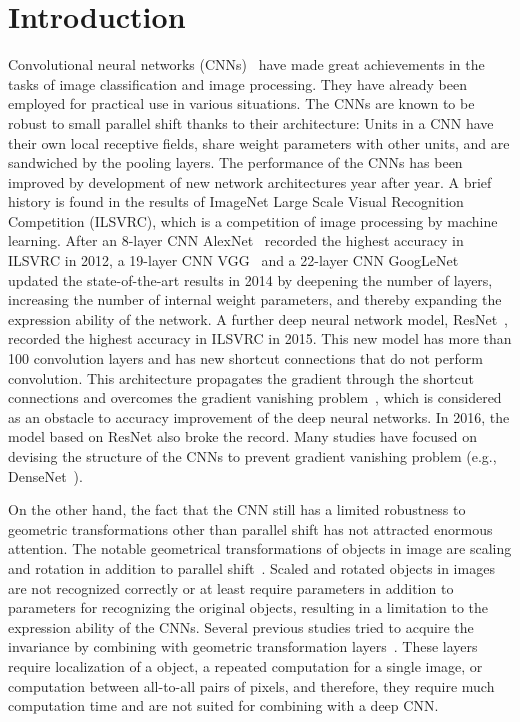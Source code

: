 \documentclass[journal]{IEEEtran}
\begin{document}
\section{Introduction}
Convolutional neural networks (CNNs)~\cite{LeCun1989} have made great achievements in the tasks of image classification and image processing.
They have already been employed for practical use in various situations.
The CNNs are known to be robust to small parallel shift thanks to their architecture: Units in a CNN have their own local receptive fields, share weight parameters with other units, and are sandwiched by the pooling layers.
The performance of the CNNs has been improved by development of new network architectures year after year.
A brief history is found in the results of ImageNet Large Scale Visual Recognition Competition (ILSVRC), which is a competition of image processing by machine learning.
After an 8-layer CNN AlexNet~\cite{Krizhevsky2012} recorded the highest accuracy in ILSVRC in 2012, a 19-layer CNN VGG~\cite{Simonyan2015a} and a 22-layer CNN GoogLeNet~\cite{Szegedy2014} updated the state-of-the-art results in 2014 by deepening the number of layers, increasing the number of internal weight parameters, and thereby expanding the expression ability of the network.
A further deep neural network model, ResNet~\cite{He2017}, recorded the highest accuracy in ILSVRC in 2015.
This new model has more than 100 convolution layers and has new shortcut connections that do not perform convolution.
This architecture propagates the gradient through the shortcut connections and overcomes the gradient vanishing problem~\cite{Schmidhuber2015}, which is considered as an obstacle to accuracy improvement of the deep neural networks.
In 2016, the model based on ResNet also broke the record.
Many studies have focused on devising the structure of the CNNs to prevent gradient vanishing problem (e.g., DenseNet~\cite{Huang2016b}).

On the other hand, the fact that the CNN still has a limited robustness to geometric transformations other than parallel shift has not attracted enormous attention.
The notable geometrical transformations of objects in image are scaling and rotation in addition to parallel shift~\cite{Le2010}.
Scaled and rotated objects in images are not recognized correctly or at least require parameters in addition to parameters for recognizing the original objects, resulting in a limitation to the expression ability of the CNNs.
Several previous studies tried to acquire the invariance by combining with geometric transformation layers~\cite{Jaderberg2015,Gregor2015}.
These layers require localization of a object, a repeated computation for a single image, or computation between all-to-all pairs of pixels, and therefore, they require much computation time and are not suited for combining with a deep CNN.
\end{document}
